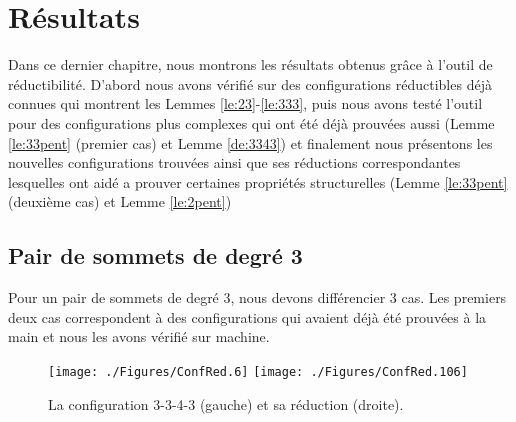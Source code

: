 \documentclass[10pt,a4paper]{article}
\newtheorem{lemme}{Lemme}
\begin{document}
%
%
%
%
%

\section{Résultats}
\label{chap:res}

Dans ce dernier chapitre, nous montrons les résultats obtenus grâce à l'outil de réductibilité. D'abord nous avons vérifié sur des configurations réductibles déjà connues qui montrent les Lemmes \ref{le:23}-\ref{le:333}, puis nous avons testé l'outil pour des configurations plus complexes qui ont été déjà prouvées aussi (Lemme \ref{le:33pent} (premier cas) et Lemme \ref{de:3343}) et finalement nous présentons les nouvelles configurations trouvées ainsi que ses réductions correspondantes lesquelles ont aidé a prouver certaines propriétés structurelles (Lemme \ref{le:33pent} (deuxième cas) et Lemme \ref{le:2pent})  
\subsection{Pair de sommets de degré 3}
Pour un pair de sommets de degré 3, nous devons différencier 3 cas. Les premiers deux cas correspondent à des configurations qui avaient déjà été prouvées à la main et nous les avons vérifié sur machine.

\begin{figure}[ht]
\centerline{
\texttt{[image: ./Figures/ConfRed.6]}
\hfil
\texttt{[image: ./Figures/ConfRed.106]}
}
\caption{La configuration 3-3-4-3 (gauche) et sa réduction (droite).}
\label{fig:3343}
\end{figure}
\end{document}
